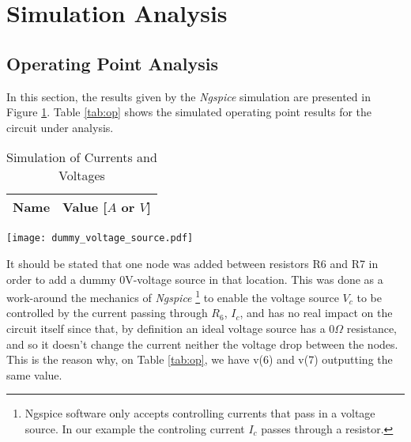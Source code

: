 \section{Simulation Analysis}
\label{sec:simulation}

\subsection{Operating Point Analysis}

In this section, the results given by the \textit{Ngspice} simulation are presented in Figure \ref{fig:alternative_circuit_for_ngspice}. Table \ref{tab:op} shows the simulated operating point results for the circuit
under analysis.

\begin{table}[h]
  \begin{minipage}{0.4\textwidth}
  \centering
  \begin{tabular}{|l|c|}
    \hline    
    {\bf Name} & {\bf Value [$A$ or $V$]} \\ \hline
    
  \end{tabular}
  \caption[Simulation of Currents and Voltages]{Simulation of Currents and Voltages\footnotemark}
  \label{tab:op}
  \end{minipage}
  \hfill
  \begin{minipage}{0.53\textwidth}
    \centering
    \texttt{[image: dummy\_voltage\_source.pdf]}
    \label{fig:alternative_circuit_for_ngspice}
  \end{minipage}
\end{table}

It should be stated that one node was added between resistors R6 and R7 in order to add a dummy 0V-voltage source in that location. This was done as a work-around the mechanics of \emph{Ngspice} \footnote{Ngspice software only accepts controlling currents that pass in a voltage source. In our example the controling current $I_c$ passes through a resistor.} to enable the voltage source $V_c$ to be controlled by the current passing through $R_6$, $I_c$, and has no real impact on the circuit itself since that, by definition an ideal voltage source has a $0\Omega$ resistance, and so it doesn't change the current neither the voltage drop between the nodes. This is the reason why, on Table \ref{tab:op}, we have v(6) and v(7) outputting the same value.

\clearpage



